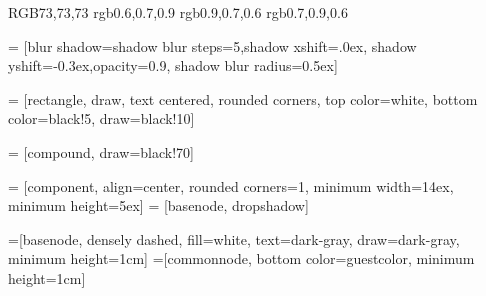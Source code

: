 \definecolor{dark-gray}   {RGB}{73,73,73}
\definecolor{usercolor}   {rgb}{0.6,0.7,0.9}
\definecolor{kernelcolor} {rgb}{0.9,0.7,0.6}
\definecolor{guestcolor}  {rgb}{0.7,0.9,0.6}

 = [blur shadow={shadow blur steps=5,shadow xshift=.0ex,
                                       shadow yshift=-0.3ex,opacity=0.9,
                                       shadow blur radius=0.5ex}]

 = [rectangle, draw, text centered,
                        rounded corners,
                        top color=white,
                        bottom color=black!5,
                        draw=black!10]

 = [compound, draw=black!70]

 = [component, align=center,
                        rounded corners=1, minimum width=14ex,
                        minimum height=5ex]
 = [basenode, dropshadow]

=[basenode, densely dashed, fill=white, text=dark-gray, draw=dark-gray, minimum height=1cm]
=[commonnode, bottom color=guestcolor, minimum height=1cm]
